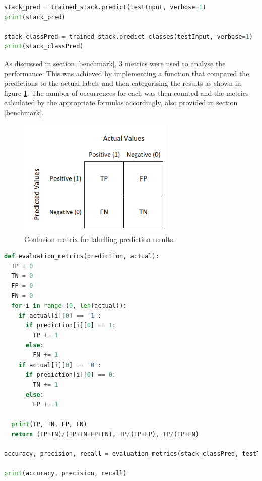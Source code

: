 \documentclass[10pt,onecolumn,letterpaper]{article}
\begin{document}
\begin{lstlisting}[language=Python, breaklines=true, caption= {Keras predict functions to generate predicted labels from test data.}]
stack_pred = trained_stack.predict(testInput, verbose=1)
print(stack_pred)

stack_classPred = trained_stack.predict_classes(testInput, verbose=1)
print(stack_classPred)
\end{lstlisting} 

As discussed in section \ref{benchmark}, 3 metrics were used to analyse the performance. This was achieved by implementing a function that compared the predictions to the actual labels and then categorising the results as shown in figure \ref{confusion_matrix}. The number of occurrences for each was then counted and the metrics calculated by the appropriate formulas accordingly, also provided in section \ref{benchmark}.

\begin{figure}[!hbt!]
\centering
\includegraphics[width=7.5cm]{confusion_matrix.png}
\caption{Confusion matrix for labelling prediction results.}
\label{confusion_matrix}
\end{figure}

\begin{lstlisting}[language=Python, breaklines=true, caption= Implemented function which evaluates the model prediction performance based on accuracy\, precision and recall.]
def evaluation_metrics(prediction, actual):
  TP = 0
  TN = 0
  FP = 0
  FN = 0
  for i in range (0, len(actual)):
    if actual[i][0] == '1':
      if prediction[i][0] == 1:
        TP += 1
      else:
        FN += 1
    if actual[i][0] == '0':
      if prediction[i][0] == 0:
        TN += 1
      else: 
        FP += 1
     
  print(TP, TN, FP, FN)
  return (TP+TN)/(TP+TN+FP+FN), TP/(TP+FP), TP/(TP+FN)

accuracy, precision, recall = evaluation_metrics(stack_classPred, testTarget)

print(accuracy, precision, recall)
\end{lstlisting} 
\end{document}
